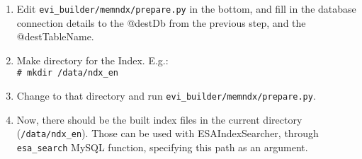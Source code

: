\documentclass{article}
\begin{document}
\begin{enumerate}
\item Edit \texttt{evi\_builder/memndx/prepare.py} in the bottom, and fill in the database connection details to the @destDb from the previous step, and the @destTableName.
\item Make directory for the Index. E.g.:\\
\texttt{\# mkdir /data/ndx\_en}
\item Change to that directory and run \texttt{evi\_builder/memndx/prepare.py}.
\item Now, there should be the built index files in the current directory (\texttt{/data/ndx\_en}). Those can be used with ESAIndexSearcher, through \texttt{esa\_search} MySQL function, specifying this path as an argument.
\end{enumerate}
\end{document}

